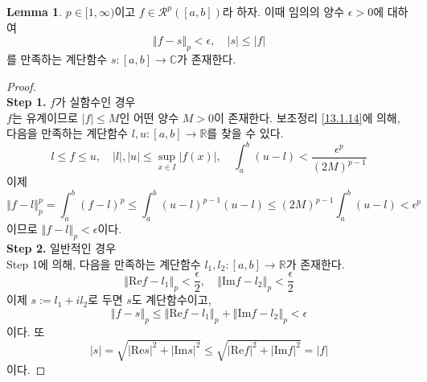 \documentclass[11pt]{book}
\numberwithin{equation}{chapter}
\def\RR{\mathbb{R}}
\def\CC{\mathbb{C}}
\def\eps{\epsilon}
\def\calR{\mathcal{R}}
\newcommand{\abs}[1]{\left\vert#1\right\vert}
\newcommand{\norm}[1]{\left\Vert#1\right\Vert}
\theoremstyle{definition}
\newtheorem{lem}[thm]{Lemma}
\begin{document}
\begin{lem} \label{13.3.15}
    \(p \in [1, \infty)\)이고 \(f \in \calR^p([a, b])\)라 하자. 이때 임의의 양수 \(\eps > 0\)에 대하여
    \[
        \norm{f - s}_p < \eps, \quad \abs{s} \le \abs{f}
    \]
    를 만족하는 계단함수 \(s : [a, b] \to \CC\)가 존재한다.
\end{lem}
\begin{proof}
    \quad\\
    \textbf{Step 1.} \(f\)가 실함수인 경우\\
    \(f\)는 유계이므로 \(\abs{f} \le M\)인 어떤 양수 \(M > 0\)이 존재한다. 보조정리 \ref{13.1.14}에 의해, 다음을 만족하는 계단함수 \(l, u : [a, b] \to \RR\)를 찾을 수 있다.
    \[
        l \le f \le u, \quad \abs{l}, \abs{u} \le \sup_{x \in I} \abs{f(x)}, \quad \int_a^b (u - l) < \frac{\eps^p}{(2M)^{p-1}}
    \]
    이제
    \[
    \norm{f - l}_p^p = \int_a^b (f - l)^p \le \int_a^b (u - l)^{p-1}(u - l) \le (2M)^{p-1} \int_a^b (u - l) < \eps^p    
    \]
    이므로 \(\norm{f - l}_p < \eps\)이다.\\
    \textbf{Step 2.} 일반적인 경우\\
    Step 1에 의해, 다음을 만족하는 계단함수 \(l_1, l_2 : [a, b] \to \RR\)가 존재한다.
    \[
    \norm{\mathrm{Re}f - l_1}_p < \frac{\eps}{2}, \quad \norm{\mathrm{Im}f - l_2}_p < \frac{\eps}{2}    
    \]
    이제 \(s := l_1 + il_2\)로 두면 \(s\)도 계단함수이고,
    \[
    \norm{f - s}_p \le \norm{\mathrm{Re}f - l_1}_p +  \norm{\mathrm{Im}f - l_2}_p < \eps
    \]
    이다. 또
    \[
        \abs{s} = \sqrt{\abs{\mathrm{Re}s}^2 + \abs{\mathrm{Im}s}^2} \le \sqrt{\abs{\mathrm{Re}f}^2 + \abs{\mathrm{Im}f}^2} = \abs{f}
    \]
    이다.
\end{proof}
\end{document}
